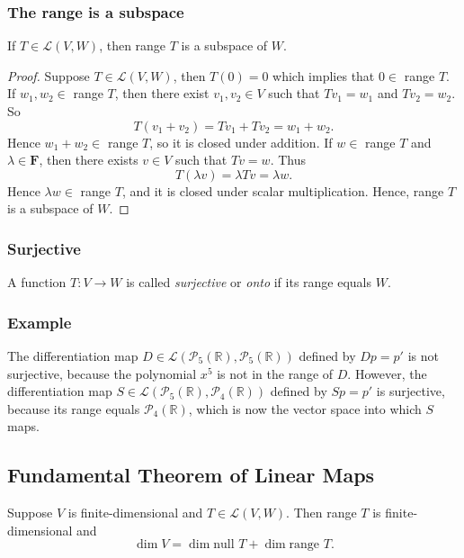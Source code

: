 \documentclass[11pt]{article}
\begin{document}
    \subsubsection{The range is a subspace}

    If \(T \in \mathcal{L}(V,W)\), then range $T$ is a subspace of $W$.

    \begin{proof}
        Suppose \(T \in \mathcal{L}(V,W)\), then \(T(0) = 0\) which implies that \(0 \in \) range $T$. If \(w_1, w_2 \in \) range $T$, then there exist \(v_1, v_2 \in V\) such that \(Tv_1 = w_1\) and \(Tv_2 = w_2\). So \[T(v_1 + v_2) = Tv_1 + Tv_2 = w_1 + w_2.\] Hence \(w_1 + w_2 \in \) range $T$, so it is closed under addition. If \(w \in \) range $T$ and \(\lambda \in \textbf{F}\), then there exists \(v \in V\) such that \(Tv = w\). Thus \[T(\lambda v) = \lambda Tv = \lambda w.\] Hence \(\lambda w \in \) range $T$, and it is closed under scalar multiplication. Hence, range $T$ is a subspace of $W$. 
    \end{proof}

    \subsubsection{Surjective}

    A function \(T:V \rightarrow W\) is called \emph{surjective} or \emph{onto} if its range equals $W$. 

    \subsubsection{Example}

    The differentiation map \(D \in \mathcal{L}(\mathcal{P}_5 (\mathbb{R}), \mathcal{P}_5 (\mathbb{R}))\) defined by \(Dp = p'\) is not surjective, because the polynomial $x^5$ is not in the range of $D$. However, the differentiation map \(S \in \mathcal{L}(\mathcal{P}_5 (\mathbb{R}), \mathcal{P}_4 (\mathbb{R}))\) defined by \(Sp = p'\) is surjective, because its range equals \(\mathcal{P}_4 (\mathbb{R})\), which is now the vector space into which $S$ maps. 

    \subsection{Fundamental Theorem of Linear Maps}

    Suppose $V$ is finite-dimensional and \(T \in \mathcal{L}(V,W)\). Then range $T$ is finite-dimensional and \[\dim V = \dim \text{null } T + \dim \text{range } T.\]
\end{document}
